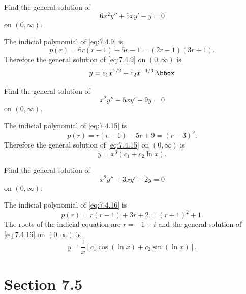 \setcounter{example}{4}
\setcounter{equation}{8}
\begin{example}
  \label{example:7.4.5} \rm Find the general solution of
  \begin{equation}
    \label{eq:7.4.9}6x^{2}y''+5xy'-y=0
  \end{equation}
  on $(0,\infty)$.
\end{example}
\begin{examplesolution}
\solution The indicial polynomial of \eqref{eq:7.4.9} is
\[
  p(r)=6r(r-1)+5r-1=(2r-1)(3r+1).
\]
Therefore the general solution of \eqref{eq:7.4.9} on $(0,\infty)$ is
\[
  y=c_{1}x^{1/2}+c_{2}x^{-1/3}.\bbox
\]
\end{examplesolution}

\setcounter{example}{5}
\setcounter{equation}{14}
\begin{example}
  \label{example:7.4.6} \rm Find the general solution of
  \begin{equation}
    \label{eq:7.4.15}x^{2}y''-5xy'+9y=0
  \end{equation}
  on $(0,\infty)$.
\end{example}
\begin{examplesolution}
\solution The indicial polynomial of \eqref{eq:7.4.15} is
\[
  p(r)=r(r-1)-5r+9=(r-3)^{2}.
\]
Therefore the general solution of \eqref{eq:7.4.15} on $(0,\infty)$ is
\[
  y=x^{3}(c_{1}+c_{2}\ln x).
\]
\end{examplesolution}

\setcounter{example}{6}
\setcounter{equation}{15}
\begin{example}
  \label{example:7.4.7} \rm Find the general solution of
  \begin{equation}
    \label{eq:7.4.16}x^{2}y''+3xy'+2y=0
  \end{equation}
  on $(0,\infty)$.
\end{example}
\begin{examplesolution}
\solution The indicial polynomial of \eqref{eq:7.4.16} is
\[
  p(r)=r(r-1)+3r+2=(r+1)^{2}+1.
\]
The roots of the indicial equation are $r=-1\pm i$ and the general solution of \eqref{eq:7.4.16} on
$(0,\infty)$ is
\[
  y=\frac{1}{x}\left[c_{1}\cos(\ln x)+c_{2}\sin(\ln x)\right].
\]
\end{examplesolution}

\section*{Section 7.5}
\setcounter{chapter}{7}
\setcounter{section}{5}


